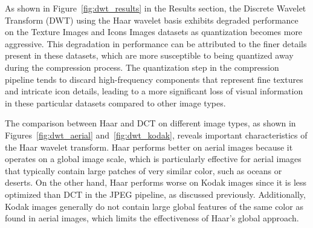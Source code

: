 
As shown in Figure~\ref{fig:dwt_results} in the Results section, the Discrete Wavelet Transform (DWT) using the Haar wavelet basis exhibits degraded performance on the Texture Images and Icons Images datasets as quantization becomes more aggressive. This degradation in performance can be attributed to the finer details present in these datasets, which are more susceptible to being quantized away during the compression process. The quantization step in the compression pipeline tends to discard high-frequency components that represent fine textures and intricate icon details, leading to a more significant loss of visual information in these particular datasets compared to other image types.

The comparison between Haar and DCT on different image types, as shown in Figures~\ref{fig:dwt_aerial} and~\ref{fig:dwt_kodak}, reveals important characteristics of the Haar wavelet transform. Haar performs better on aerial images because it operates on a global image scale, which is particularly effective for aerial images that typically contain large patches of very similar color, such as oceans or deserts. On the other hand, Haar performs worse on Kodak images since it is less optimized than DCT in the JPEG pipeline, as discussed previously. Additionally, Kodak images generally do not contain large global features of the same color as found in aerial images, which limits the effectiveness of Haar's global approach.
